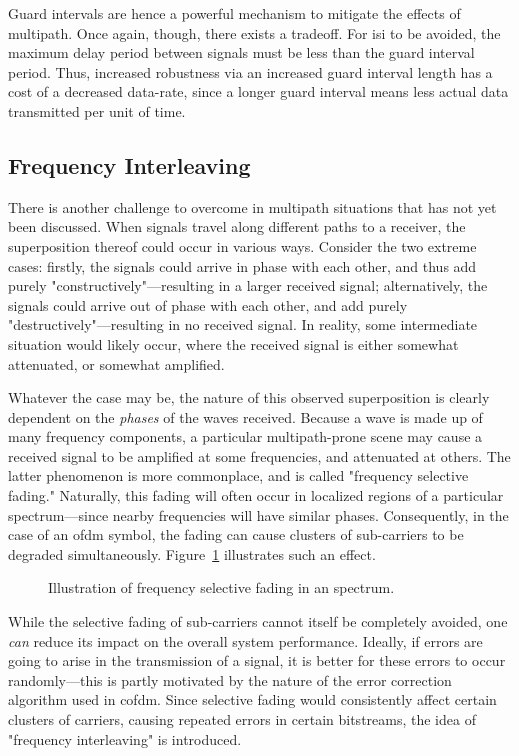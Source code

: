 \documentclass[class=report,11pt,crop=false]{standalone}
\begin{document}
Guard intervals are hence a powerful mechanism to mitigate the effects of multipath. Once again, though, there exists a tradeoff. For \gls{isi} to be avoided, the maximum delay period between signals must be less than the guard interval period. Thus, increased robustness via an increased guard interval length has a cost of a decreased data-rate, since a longer guard interval means less actual data transmitted per unit of time.

\subsection{Frequency Interleaving}
There is another challenge to overcome in multipath situations that has not yet been discussed. When signals travel along different paths to a receiver, the superposition thereof could occur in various ways. Consider the two extreme cases: firstly, the signals could arrive in phase with each other, and thus add purely "constructively"---resulting in a larger received signal; alternatively, the signals could arrive out of phase with each other, and add purely "destructively"---resulting in no received signal. In reality, some intermediate situation would likely occur, where the received signal is either somewhat attenuated, or somewhat amplified.

Whatever the case may be, the nature of this observed superposition is clearly dependent on the \emph{phases} of the waves received. Because a wave is made up of many frequency components, a particular multipath-prone scene may cause a received signal to be amplified at some frequencies, and attenuated at others. The latter phenomenon is more commonplace, and is called "frequency selective fading." Naturally, this fading will often occur in localized regions of a particular spectrum---since nearby frequencies will have similar phases. Consequently, in the case of an \gls{ofdm} symbol, the fading can cause clusters of sub-carriers to be degraded simultaneously. Figure~\ref{fig:ofdm-selective-fading} illustrates such an effect.

\begin{figure}[htbp]
    \centering
    \captionsetup{type=figure}
    \def\svgwidth{1\linewidth}
    { %
        }
    \caption{Illustration of frequency selective fading in an  spectrum.}
    \label{fig:ofdm-selective-fading}
\end{figure}

While the selective fading of sub-carriers cannot itself be completely avoided, one \emph{can} reduce its impact on the overall system performance. Ideally, if errors are going to arise in the transmission of a signal, it is better for these errors to occur randomly---this is partly motivated by the nature of the error correction algorithm used in \gls{cofdm}. Since selective fading would consistently affect certain clusters of carriers, causing repeated errors in certain bitstreams, the idea of "frequency interleaving" is introduced.
\end{document}
